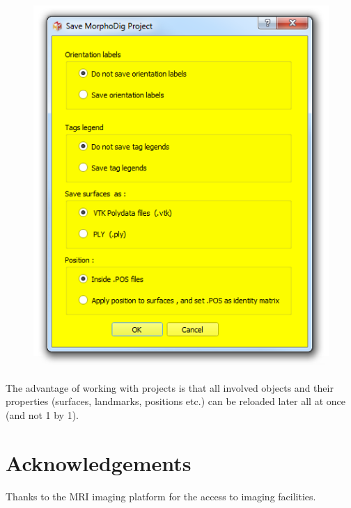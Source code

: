\documentclass[12pt, a4paper]{book}
\begin{document}
\begin{figure}
  \centering  
 \includegraphics[scale=0.5]{../images/07/project/save_ntw.png}
\label{save_project_file}
\end{figure}

The advantage of working with projects is that all involved objects and their properties (surfaces, landmarks, positions etc.) can be reloaded later all at once (and not 1 by 1). 

\section{Acknowledgements}
Thanks to the MRI imaging platform for the access to imaging facilities.



%  		
\end{document}
